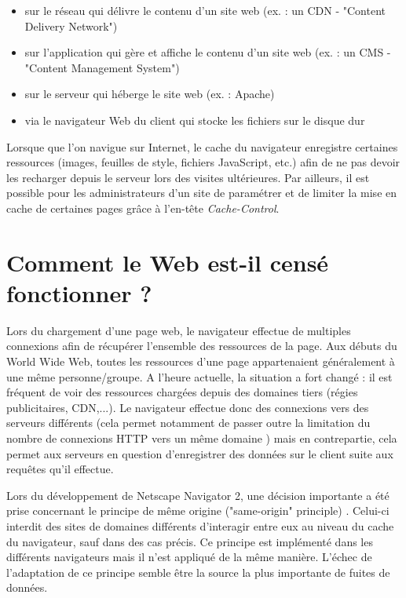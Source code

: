 \begin{itemize}
  \item sur le réseau qui délivre le contenu d'un site web (ex. : un CDN - "Content Delivery Network")
  \item sur l'application qui gère et affiche le contenu d'un site web (ex. : un CMS - "Content Management System")
  \item sur le serveur qui héberge le site web (ex. : Apache)
  \item via le navigateur Web du client qui stocke les fichiers sur le disque dur
  \newline
\end{itemize}

Lorsque que l'on navigue sur Internet, le cache du navigateur enregistre certaines ressources (images, feuilles de style, fichiers JavaScript, etc.) afin de ne pas devoir les recharger depuis le serveur lors des visites ultérieures. Par ailleurs, il est possible pour les administrateurs d'un site de paramétrer et de limiter la mise en cache de certaines pages grâce à l'en-tête \textit{Cache-Control}.


\section{Comment le Web est-il censé fonctionner ?}
\label{web-expl}
Lors du chargement d'une page web, le navigateur effectue de multiples connexions afin de récupérer l'ensemble des ressources de la page. Aux débuts du World Wide Web, toutes les ressources d'une page appartenaient généralement à une même personne/groupe. A l'heure actuelle, la situation a fort changé : il est fréquent de voir des ressources chargées depuis des domaines tiers (régies publicitaires, CDN,...). Le navigateur effectue donc des connexions vers des serveurs différents (cela permet notamment de passer outre la limitation du nombre de connexions HTTP vers un même domaine \cite{W3_RFC2616_Section8}) mais en contrepartie, cela permet aux serveurs en question d'enregistrer des données sur le client suite aux requêtes qu'il effectue.
\newline

Lors du développement de Netscape Navigator 2, une décision importante a été prise concernant le principe de même origine ("same-origin" principle) \cite{Jackson:2006:PBS:1135777.1135884}. Celui-ci interdit des sites de domaines différents d'interagir entre eux au niveau du cache du navigateur, sauf dans des cas précis. Ce principe est implémenté dans les différents navigateurs mais il n'est appliqué de la même manière. L'échec de l'adaptation de ce principe semble être la source la plus importante de fuites de données.

